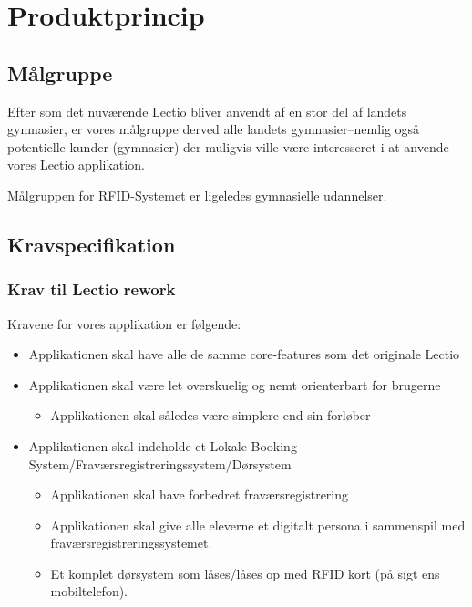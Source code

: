 \section{Produktprincip}
    \subsection{Målgruppe}
    Efter som det nuværende Lectio bliver anvendt af en stor del af landets gymnasier, er vores målgruppe derved alle landets gymnasier--nemlig også potentielle kunder (gymnasier) der
    muligvis ville være interesseret i at anvende vores Lectio applikation. 
    
    Målgruppen for RFID-Systemet er ligeledes gymnasielle udannelser.

    \subsection{Kravspecifikation}
    \subsubsection{Krav til Lectio rework}
    Kravene for vores applikation er følgende: 
    \begin{itemize}
        \item Applikationen skal have alle de samme core-features som det originale Lectio
        \item Applikationen skal være let overskuelig og nemt orienterbart for brugerne
        \begin{itemize}
            \item Applikationen skal således være simplere end sin forløber
        \end{itemize}
        \item Applikationen skal indeholde et Lokale-Booking-System/Fraværsregistreringssystem/Dørsystem 
        \begin{itemize}
            \item Applikationen skal have forbedret fraværsregistrering
            \item Applikationen skal give alle eleverne et digitalt persona i sammenspil med fraværsregistreringssystemet. 
            \item Et komplet dørsystem som låses/låses op med RFID kort (på sigt ens mobiltelefon). 
        \end{itemize}
    \end{itemize}
    
